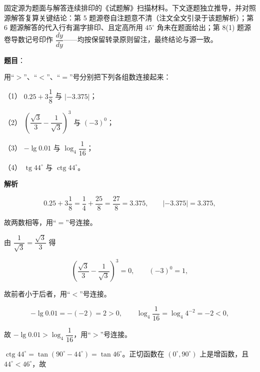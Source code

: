 

\begin{gktip}
固定源为题面与解答连续排印的《试题解》扫描材料。下文逐题独立推导，并对照源解答复算关键结论：第 5 题源卷自注题意不清（注文全文引录于该题解析）；第 6 题源解答的代入行有漏字排印、且定高所用 $45^\circ$ 角未在题面给出；第 8(1) 题源卷导数记号印作 $\dfrac{dy}{dy}$——均按保留转录原则留注，最终结论与源一致。
\end{gktip}

\begin{answer}

\textbf{题目}：

用“$>$”、“$<$”、“$=$”号分别把下列各组数连接起来：

（1） $0.25+3\dfrac{1}{8}$ 与 $|-3.375|$；

（2） $\left(\dfrac{\sqrt{3}}{3}-\dfrac{1}{\sqrt{3}}\right)^{3}$ 与 $(-3)^{0}$；

（3） $-\lg 0.01$ 与 $\log_4\dfrac{1}{16}$；

（4） $\operatorname{tg} 44^\circ$ 与 $\operatorname{ctg} 44^\circ$。

\textbf{解析}


\nopagebreak[4]
\[
0.25+3\frac{1}{8}=\frac{1}{4}+\frac{25}{8}=\frac{27}{8}=3.375,
\qquad
|-3.375|=3.375,
\]

故两数相等，用“$=$”号连接。


由 $\dfrac{1}{\sqrt{3}}=\dfrac{\sqrt{3}}{3}$ 得

\nopagebreak[4]
\[
\left(\frac{\sqrt{3}}{3}-\frac{1}{\sqrt{3}}\right)^{3}=0,
\qquad
(-3)^{0}=1,
\]

故前者小于后者，用“$<$”号连接。


\nopagebreak[4]
\[
-\lg 0.01=-(-2)=2>0,
\qquad
\log_4\frac{1}{16}=\log_4 4^{-2}=-2<0,
\]

故 $-\lg 0.01>\log_4\dfrac{1}{16}$，用“$>$”号连接。


$\operatorname{ctg}44^\circ=\tan(90^\circ-44^\circ)=\tan 46^\circ$。正切函数在 $(0^\circ,90^\circ)$ 上是增函数，且 $44^\circ<46^\circ$，故


\end{answer}
